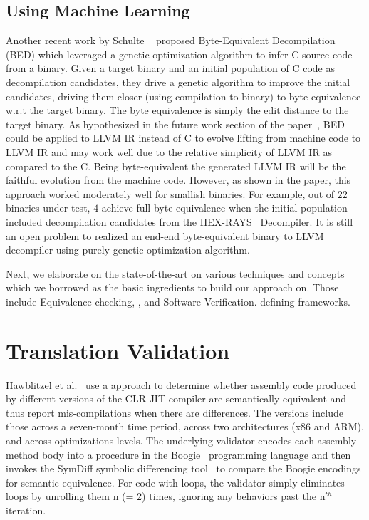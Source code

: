 \subsection{Using Machine Learning} Another recent work by Schulte
\etal~\cite{eschulte2018bed} proposed Byte-Equivalent Decompilation (BED) which
leveraged a genetic optimization algorithm to infer C source code from a
binary. Given a target binary and an initial population of C code as
decompilation candidates, they  drive a genetic algorithm to improve the
initial candidates, driving them closer (using compilation to binary) to
byte-equivalence w.r.t the target binary. The byte equivalence  is simply the
edit distance to the target binary. As hypothesized in the future work section
of the paper~\cite{eschulte2018bed}, BED could be applied to LLVM IR instead of
C to evolve lifting from machine code to LLVM IR and may work well due to the
relative simplicity of LLVM IR as compared to the C. Being byte-equivalent the
generated LLVM IR will be the faithful evolution from the machine code.
However, as shown in the paper, this approach worked moderately well for
smallish binaries. For example, out of $22$ binaries under test,  $4$ achieve full byte equivalence when the initial
    population included decompilation candidates from the
    HEX-RAYS~\cite{hexray} Decompiler. It is still an open problem to realized
    an end-end byte-equivalent binary to LLVM decompiler using purely genetic
    optimization algorithm. 


Next, we elaborate on the state-of-the-art on various techniques and concepts
which we borrowed as the basic ingredients to build our approach on. Those
include Equivalence checking, \TV, and Software Verification.%
defining frameworks. 

\section{Translation Validation}

Hawblitzel et al.~\cite{Hawblitzel:FSE2013} use a \tv approach to determine
whether assembly code produced by different versions of the CLR JIT compiler
are semantically equivalent and thus report mis-compilations when there are
differences. The versions include those across a seven-month time period,
  across two architectures (x86 and ARM), and across optimizations levels. The
  underlying validator encodes each assembly method body into a procedure in
  the Boogie~\cite{Boogie:2005}  programming language and then invokes the
  SymDiff symbolic differencing tool~\cite{SYMDIFF:2012} to compare the Boogie
  encodings for semantic equivalence. For code with loops, the validator simply
  eliminates loops by unrolling them n (= 2) times, ignoring any behaviors past
  the n$^{th}$ iteration.
 

